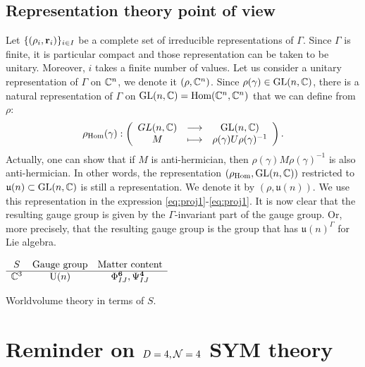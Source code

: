 \documentclass[a4paper,11pt]{article}
\begin{document}
    \subsection{Representation theory point of view}

        Let $\{(\rho_i,\textbf{r}_i)\}_{i\in I}$ be a complete set of irreducible representations of $\Gamma$. Since $\Gamma$ is finite, it is particular compact and those representation can be taken to be unitary. Moreover, $i$ takes a finite number of values. Let us consider a unitary representation of $\Gamma$ on $\mathbb{C}^n$, we denote it $(\rho,\mathbb{C}^n)$. Since $\rho(\gamma)\in\text{GL}(n,\mathbb{C})$, there is a natural representation of $\Gamma$ on $\text{GL}(n,\mathbb{C})=\text{Hom}(\mathbb{C}^n,\mathbb{C}^n)$ that we can define from $\rho$:
        \begin{equation}
            \rho_{\text{Hom}}(\gamma):\left(
            \begin{array}{ccc}
                GL(n,\mathbb{C}) & \longrightarrow & \text{GL}(n,\mathbb{C}) \\
                M & \longmapsto & \rho(\gamma)U\rho(\gamma)^{-1}
            \end{array}
            \right).
        \end{equation}
        Actually, one can show that if $M$ is anti-hermician, then $\rho(\gamma) M\rho(\gamma)^{-1}$ is also anti-hermician. In other words, the representation $(\rho_{\text{Hom}},\text{GL}(n,\mathbb{C}))$ restricted to $\mathfrak{u}(n)\subset\text{GL}(n,\mathbb{C})$ is still a representation. We denote it by $(\rho,\mathfrak{u}(n))$. We use this representation in the expression \eqref{eq:proj1}-\eqref{eq:proj1}. It is now clear that the resulting gauge group is given by the $\Gamma$-invariant part of the gauge group. Or, more precisely, that the resulting gauge group is the group that has $\mathfrak{u}(n)^\Gamma$ for Lie algebra.

    \begin{table}[H]
        \centering
        $
        \begin{array}{ccc}
            S & \text{Gauge group} & \text{Matter content} \\ \hline
            \mathbb{C}^3 & \text{U}(n) & \Phi^{\boldsymbol{6}}_{IJ},\Psi^{\boldsymbol{4}}_{IJ}
        \end{array}
        $
        \caption{Worldvolume theory in terms of $S$.}
    \end{table}

\pagebreak
\appendix

\section{Reminder on $D=4,\mathcal{N}=4$ SYM theory}\label{sec:N4SCFT}
        
\end{document}
